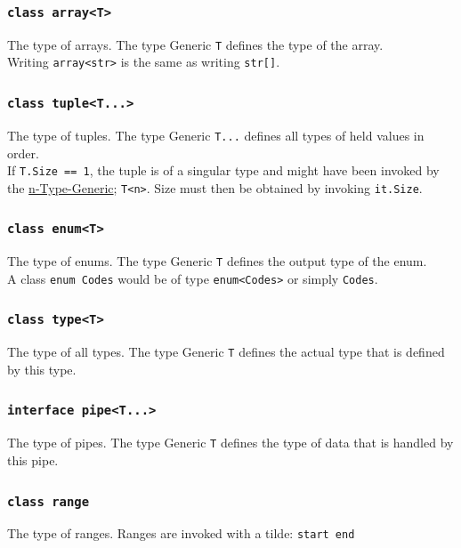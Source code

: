\documentclass{docs}
\begin{document}
    \label{typeArray}
    \subsubsection{\texttt{class array<T>}}
    The type of arrays. The type Generic \texttt{T} defines the type of the array.
    \\
    Writing \texttt{array<str>} is the same as writing \texttt{str[]}.
    
    \label{typeTuple}
    \subsubsection{\texttt{class tuple<T...>}}
    The type of tuples. The type Generic \texttt{T...} defines all types of held values in order.
    \\
    If \texttt{T.Size == 1}, the tuple is of a singular type and might have been invoked by the \hyperref[typeGenN]{n-Type-Generic}; \texttt{T<n>}.
    Size must then be obtained by invoking \texttt{it.Size}.
    
    \label{typeEnum}
    \subsubsection{\texttt{class enum<T>}}
    The type of enums. The type Generic \texttt{T} defines the output type of the enum.
    \\
    A class \texttt{enum Codes} would be of type \texttt{enum<Codes>} or simply \texttt{Codes}.
    
    \label{typeType}
    \subsubsection{\texttt{class type<T>}}
    The type of all types. The type Generic \texttt{T} defines the actual type that is defined by this type.

    \label{typePipe}
    \subsubsection{\texttt{interface pipe<T...>}}
    The type of pipes. The type Generic \texttt{T} defines the type of data that is handled by this pipe.
    
    \label{typeRange}
    \subsubsection{\texttt{class range}}
    The type of ranges. Ranges are invoked with a tilde: \texttt{start~end}
    
\end{document}
